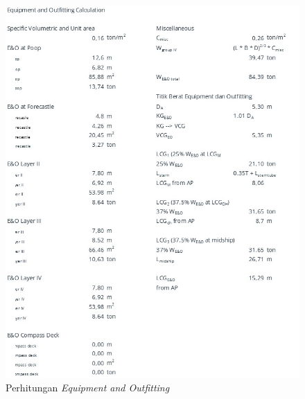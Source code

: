 \begin{figure}[!ht]
    \centering
    \includegraphics[width=\linewidth,keepaspectratio]{lampiran/deskap-9.jpg}
    \caption*{Perhitungan \emph{Equipment and Outfitting}}
\end{figure}

